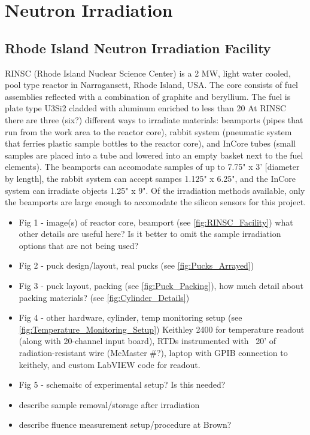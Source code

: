 \section{Neutron Irradiation}
\label{sec:irradiation}

\subsection{Rhode Island Neutron Irradiation Facility}
\label{subsec:RINSC}
RINSC (Rhode Island Nuclear Science Center) is a 2 MW, light water cooled, pool type reactor in Narragansett, Rhode Island, USA.
The core consists of fuel assemblies reflected with a combination of graphite and beryllium.
The fuel is plate type U3Si2 cladded with aluminum enriched to less than 20%
At RINSC there are three (six?) different ways to irradiate materials: beamports (pipes that run from the work area to the reactor core), rabbit system (pneumatic system that ferries plastic sample bottles to the reactor core), and InCore tubes (small samples are placed into a tube and lowered into an empty basket next to the fuel elements). 
The beamports can accomodate samples of up to 7.75" x 3' [diameter by length], the rabbit system can accept sampes 1.125" x 6.25", and the InCore system can irradiate objects 1.25" x 9". 
Of the irradiation methods available, only the beamports are large enough to accomodate the silicon sensors for this project.
\begin{itemize}
    \item Fig 1 - image(s) of reactor core, beamport (see \ref{fig:RINSC_Facility})
    what other details are useful here?
    Is it better to omit the sample irradiation options that are not being used?
    \item Fig 2 - puck design/layout, real pucks (see \ref{fig:Pucks_Arrayed})
    \item Fig 3 - puck layout, packing (see \ref{fig:Puck_Packing}), how much detail about packing materials? (see \ref{fig:Cylinder_Details})
    \item Fig 4 - other hardware, cylinder, temp monitoring setup (see \ref{fig:Temperature_Monitoring_Setup})
    Keithley 2400 for temperature readout (along with 20-channel input board), RTDs instrumented with ~20' of radiation-resistant wire (McMaster #?), laptop with GPIB connection to keithely, and custom LabVIEW code for readout.
    \item Fig 5 - schemaitc of experimental setup? Is this needed?
    \item describe sample removal/storage after irradiation
    \item describe fluence measurement setup/procedure at Brown? 
\end{itemize}

